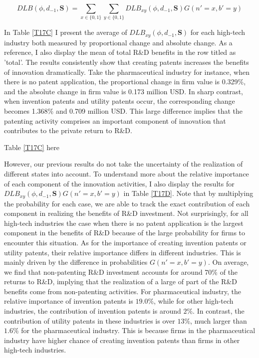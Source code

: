 \documentclass[English]{article}
\begin{document}
\begin{equation} \label{decompose}
DLB(\phi, d_{-1},\mathbf{S})=\sum _{x\in\{0,1\}}\sum_{y\in\{0,1\}}DLB_{xy}(\phi, d_{-1},\mathbf{S})G(n'=x,b'=y)
\end{equation}

In Table \ref{T17C} I present the average of $DLB_{xy}(\phi, d_{-1},\mathbf{S})$ for each high-tech industry both measured by proportional change and absolute change. As a reference, I also display the mean of total R\&D benefits in the row titled as 'total'. The results consistently show that creating patents increases the benefits of innovation dramatically. Take the pharmaceutical industry for instance, when there is no patent application, the proportional change in firm value is 0.329\%, and the absolute change in firm value is 0.173 million USD. In sharp contrast, when invention patents and utility patents occur, the corresponding change becomes 1.368\% and 0.709 million USD. This large difference implies that the patenting activity comprises an important component of innovation that contributes to the private return to R\&D.

\begin{center}
Table \ref{T17C} here
\end{center}

However, our previous results do not take the uncertainty of the realization of different states into account. To understand more about the relative importance of each component of the innovation activities, I also display the results for $DLB_{xy}(\phi, d_{-1},\mathbf{S})G(n'=x,b'=y)$ in Table \ref{T17D}. Note that by multiplying the probability for each case, we are able to track the exact contribution of each component in realizing the benefits of R\&D investment. Not surprisingly, for all high-tech industries the case when there is no patent application is the largest component in the benefits of R\&D because of the large probability for firms to encounter this situation. As for the importance of creating invention patents or utility patents, their relative importance differs in different industries. This is mainly driven by the difference in probabilities $G(n'=x,b'=y)$. On average, we find that non-patenting R\&D investment accounts for around 70\% of the returns to R\&D, implying that the realization of a large of part of the R\&D benefits come from non-patenting activities.  For pharmaceutical industry, the relative importance of invention patents is $19.0\%$, while for other high-tech industries, the contribution of invention patents is around $2\%$. In contrast, the contribution of utility patents in these industries is over $13\%$, much larger than $1.6\%$ for the pharmaceutical industry. This is because firms in the pharmaceutical industry have higher chance of creating invention patents than firms in other high-tech industries.
\end{document}

